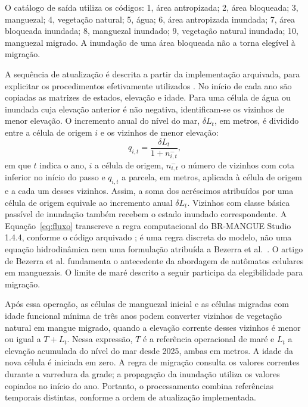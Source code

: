 \documentclass[12pt,a4paper]{article}
\begin{document}
O catálogo de saída utiliza os códigos: 1, área antropizada; 2, área bloqueada; 3, manguezal; 4, vegetação natural; 5, água; 6, área antropizada inundada; 7, área bloqueada inundada; 8, manguezal inundado; 9, vegetação natural inundada; 10, manguezal migrado. A inundação de uma área bloqueada não a torna elegível à migração.

A sequência de atualização é descrita a partir da implementação arquivada, para explicitar os procedimentos efetivamente utilizados \citep{studio2026}. No início de cada ano são copiadas as matrizes de estados, elevação e idade. Para uma célula de água ou inundada cuja elevação anterior é não negativa, identificam-se os vizinhos de menor elevação. O incremento anual do nível do mar, $\delta L_t$, em metros, é dividido entre a célula de origem $i$ e os vizinhos de menor elevação:
\begin{equation}
q_{i,t}=\frac{\delta L_t}{1+n_{i,t}^{-}},
\label{eq:fluxo}
\end{equation}
em que $t$ indica o ano, $i$ a célula de origem, $n_{i,t}^{-}$ o número de vizinhos com cota inferior no início do passo e $q_{i,t}$ a parcela, em metros, aplicada à célula de origem e a cada um desses vizinhos. Assim, a soma dos acréscimos atribuídos por uma célula de origem equivale ao incremento anual $\delta L_t$. Vizinhos com classe básica passível de inundação também recebem o estado inundado correspondente. A Equação~\ref{eq:fluxo} transcreve a regra computacional do BR-MANGUE Studio 1.4.4, conforme o código arquivado \citep{studio2026}; é uma regra discreta do modelo, não uma equação hidrodinâmica nem uma formulação atribuída a Bezerra et al.\ \citeyearpar{bezerra2014}. O artigo de Bezerra et al. fundamenta o antecedente da abordagem de autômatos celulares em manguezais. O limite de maré descrito a seguir participa da elegibilidade para migração.

Após essa operação, as células de manguezal inicial e as células migradas com idade funcional mínima de três anos podem converter vizinhos de vegetação natural em mangue migrado, quando a elevação corrente desses vizinhos é menor ou igual a $T+L_t$. Nessa expressão, $T$ é a referência operacional de maré e $L_t$ a elevação acumulada do nível do mar desde 2025, ambas em metros. A idade da nova célula é iniciada em zero. A regra de migração consulta os valores correntes durante a varredura da grade; a propagação da inundação utiliza os valores copiados no início do ano. Portanto, o processamento combina referências temporais distintas, conforme a ordem de atualização implementada.
\end{document}
